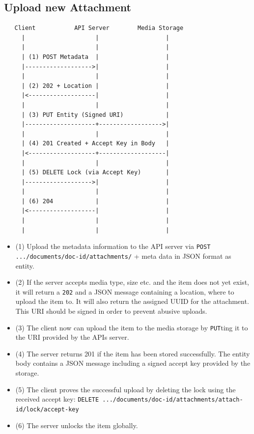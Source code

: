 \documentclass[10pt]{article}
\begin{document}
\subsection{Upload new Attachment}
\begin{verbatim}
   Client           API Server        Media Storage
     |                    |                   |
     |                    |                   |
     | (1) POST Metadata  |                   |
     |------------------->|                   |
     |                    |                   |
     | (2) 202 + Location |                   |
     |<-------------------|                   |
     |                    |                   |     
     | (3) PUT Entity (Signed URI)            |
     |--------------------+------------------>|
     |                    |                   |
     | (4) 201 Created + Accept Key in Body   |
     |<-------------------+-------------------|
     |                    |                   |
     | (5) DELETE Lock (via Accept Key)       |
     |------------------->|                   |
     |                    |                   |
     | (6) 204            |                   |
     |<-------------------|                   |
     |                    |                   |
     |                    |                   |
\end{verbatim}
\begin{itemize}
\item (1) Upload the metadata information to the API server via \texttt{POST .../documents/{doc-id}/attachments/} + meta data in JSON format as entity. 
\item (2) If the server accepts media type, size etc. and the item does not yet exist, it will return a \texttt{202} and a JSON message containing a location, where to upload the item to. It will also return the assigned UUID for the attachment. This URI should be signed in order to prevent abusive uploads.
\item (3) The client now can upload the item to the media storage by \texttt{PUT}ting it to the URI provided by the APIs server.
\item (4) The server returns 201 if the item has been stored successfully. The entity body contains a JSON message including a signed accept key provided by the storage.  
\item (5) The client proves the successful upload by deleting the lock using the received accept key: \texttt{DELETE .../documents/{doc-id}/attachments/{attach-id}/lock/{accept-key}}
\item (6) The server unlocks the item globally.
\end{itemize}
\end{document}
